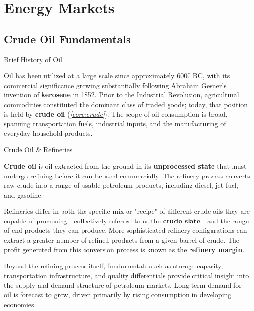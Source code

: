 \documentclass[10pt]{article}
\begin{document}
\section{Energy Markets}
  \label{sec:energy}

  \subsection{Crude Oil Fundamentals}

    \begin{core}{Brief History of Oil}

      Oil has been utilized at a large scale since approximately 6000 BC, with its commercial significance growing substantially following Abraham Gesner's invention of \textbf{kerosene} in 1852. Prior to the Industrial Revolution, agricultural commodities constituted the dominant class of traded goods; today, that position is held by \textbf{crude oil} (\textit{\autoref{core:crude}}). The scope of oil consumption is broad, spanning transportation fuels, industrial inputs, and the manufacturing of everyday household products.

    \end{core}

    \begin{core}[label=core:crude]{Crude Oil \& Refineries}

      \textbf{Crude oil} is oil extracted from the ground in its \textbf{unprocessed state} that must undergo refining before it can be used commercially. The refinery process converts raw crude into a range of usable petroleum products, including diesel, jet fuel, and gasoline.


      Refineries differ in both the specific mix or "recipe" of different crude oils they are capable of processing---collectively referred to as the \textbf{crude slate}---and the range of end products they can produce. More sophisticated refinery configurations can extract a greater number of refined products from a given barrel of crude. The profit generated from this conversion process is known as the \textbf{refinery margin}.

      Beyond the refining process itself, fundamentals such as storage capacity, transportation infrastructure, and quality differentials provide critical insight into the supply and demand structure of petroleum markets. Long-term demand for oil is forecast to grow, driven primarily by rising consumption in developing economies.

    \end{core}
\end{document}

